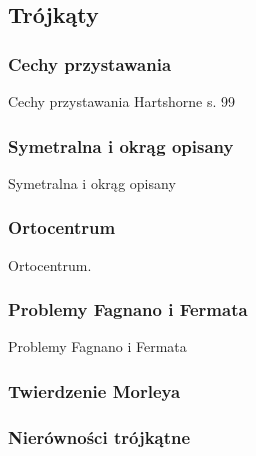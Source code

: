 \subsection{Trójkąty}

\subsubsection{Cechy przystawania}
Cechy przystawania
\loremipsum
Hartshorne s. 99









\subsubsection{Symetralna i okrąg opisany}
Symetralna i okrąg opisany
\loremipsum

\subsubsection{Ortocentrum}
Ortocentrum.
\loremipsum

\loremipsum

\subsubsection{Problemy Fagnano i Fermata}
Problemy Fagnano i Fermata
\loremipsum

\subsubsection{Twierdzenie Morleya}

\subsubsection{Nierówności trójkątne}

